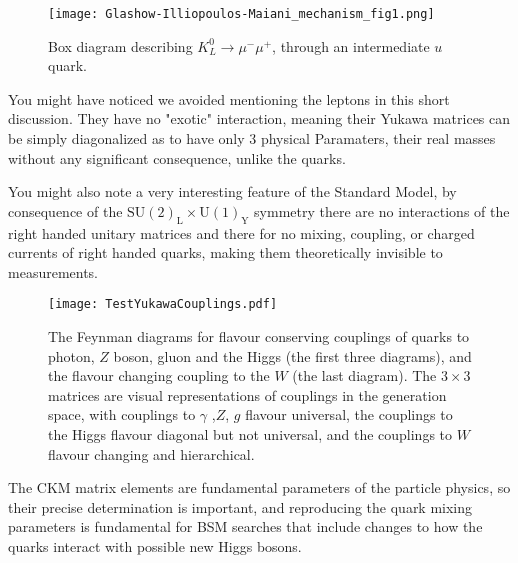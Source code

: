 \begin{figure}[H]
	\centering
	\texttt{[image: Glashow-Illiopoulos-Maiani\_mechanism\_fig1.png]}
	\caption{Box diagram describing $K_L^0\rightarrow\mu^-\mu^+$, through an intermediate $u$ quark.}
	\label{fig:Kaon}
\end{figure}

You might have noticed we avoided mentioning the leptons in this short discussion. They have no "exotic" interaction, meaning their Yukawa matrices can be simply diagonalized as to have only 3 physical Paramaters, their real masses without any significant consequence, unlike the quarks. 

You might also note a very interesting feature of the Standard Model, by consequence of the $\mathrm{SU(2)_L \times U(1)_Y }$ symmetry there are no interactions of the right handed unitary matrices and there for no mixing, coupling, or charged currents of right handed quarks, making them theoretically invisible to measurements.  
%
\begin{figure}[H]
	\centering
	\texttt{[image: TestYukawaCouplings.pdf]}
	\caption{The Feynman diagrams for flavour conserving couplings of quarks to photon, $Z$ boson, gluon and the Higgs (the first three diagrams), and the flavour changing coupling to the $W$ (the last diagram). The $3\times3$ matrices are visual representations of couplings in the generation space, with couplings to $\gamma$ ,$Z$, $g$ flavour universal, the couplings to the Higgs flavour diagonal but not universal, and the couplings to $W$ flavour changing and hierarchical.}
	\label{fig:Yukawa}
\end{figure}
%

%

The CKM matrix elements are fundamental parameters of the particle physics, so their precise determination is important, and reproducing the quark mixing parameters is fundamental for BSM searches that include changes to how the quarks interact with possible new Higgs bosons. 

